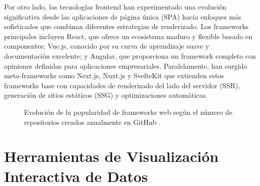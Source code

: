 Por otro lado, las tecnologías frontend han experimentado una evolución significativa desde las aplicaciones de página única (SPA) hacia enfoques más sofisticados que combinan diferentes estrategias de renderizado. Los frameworks principales \cite{Swacha2023_WebFrameworks} incluyen React, que ofrece un ecosistema maduro y flexible basado en componentes; Vue.js, conocido por su curva de aprendizaje suave y documentación excelente; y Angular, que proporciona un framework completo con opiniones definidas para aplicaciones empresariales. Paralelamente, han surgido meta-frameworks como Next.js, Nuxt.js y SvelteKit que extienden estos frameworks base con capacidades de renderizado del lado del servidor (SSR), generación de sitios estáticos (SSG) y optimizaciones automáticas. %

\begin{figure}[H]
\centering
{}
\caption{Evolución de la popularidad de frameworks web según el número de repositorios creados anualmente en GitHub \cite{Swacha2023_WebFrameworks}.}
\label{fig:frameworks_github}
\end{figure}



\section{Herramientas de Visualización Interactiva de Datos}

